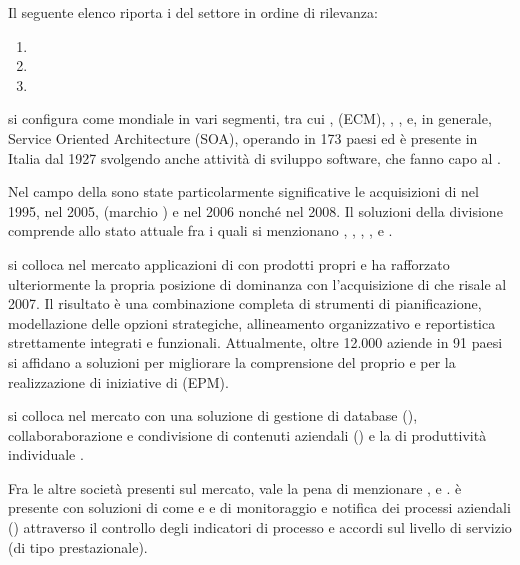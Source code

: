 Il seguente elenco riporta i  del settore in ordine di rilevanza:
\begin{enumerate}
  \item {}
  \item {}
  \item {}
\end{enumerate}

 si configura come  mondiale in vari segmenti, tra cui ,  (ECM), , ,  e, in generale, Service Oriented Architecture (SOA), operando in 173 paesi ed è presente in Italia dal 1927 svolgendo anche attività di sviluppo software, che fanno capo al .

Nel campo della \bsn {} sono state particolarmente significative le acquisizioni di  nel 1995,  nel 2005,  (marchio ) e  nel 2006 nonché  nel 2008. Il  soluzioni della divisione  comprende allo stato attuale  fra i quali si menzionano , , , ,  e .

 si colloca nel mercato applicazioni di \bsn {} con prodotti propri e ha rafforzato ulteriormente la propria posizione di dominanza con l'acquisizione di  che risale al 2007. Il risultato è una combinazione completa di strumenti di pianificazione, modellazione delle opzioni strategiche, allineamento organizzativo e reportistica strettamente integrati e funzionali. Attualmente, oltre 12.000 aziende in 91 paesi si affidano a soluzioni  per migliorare la comprensione del proprio \bsn e per la realizzazione di iniziative di  (EPM).

 si colloca nel mercato con una soluzione di gestione di database (), collaboraborazione e condivisione di contenuti aziendali () e la  di produttività individuale .

Fra le altre società presenti sul mercato, vale la pena di menzionare ,  e .  è presente con soluzioni di  come  e  e \sw di monitoraggio e notifica dei processi aziendali () attraverso il controllo degli indicatori di processo  e accordi sul livello di servizio (di tipo prestazionale).

